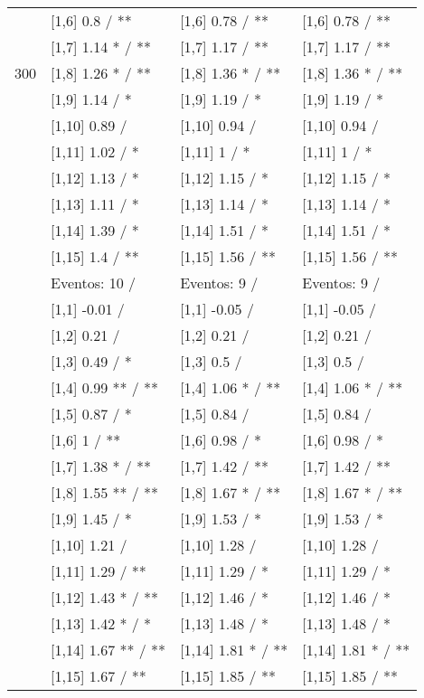 \begin{table}
\begin{tabular}[t]{llll}
 & {}[1,6] 0.8  / ** & {}[1,6] 0.78  / ** & {}[1,6] 0.78  / **\\
 & {}[1,7] 1.14 * / ** & {}[1,7] 1.17  / ** & {}[1,7] 1.17  / **\\
300 & {}[1,8] 1.26 * / ** & {}[1,8] 1.36 * / ** & {}[1,8] 1.36 * / **\\
\addlinespace
 & {}[1,9] 1.14  / * & {}[1,9] 1.19  / * & {}[1,9] 1.19  / *\\
 & {}[1,10] 0.89  / & {}[1,10] 0.94  / & {}[1,10] 0.94  /\\
 & {}[1,11] 1.02  / * & {}[1,11] 1  / * & {}[1,11] 1  / *\\
 & {}[1,12] 1.13  / * & {}[1,12] 1.15  / * & {}[1,12] 1.15  / *\\
 & {}[1,13] 1.11  / * & {}[1,13] 1.14  / * & {}[1,13] 1.14  / *\\
\addlinespace
 & {}[1,14] 1.39  / * & {}[1,14] 1.51  / * & {}[1,14] 1.51  / *\\
 & {}[1,15] 1.4  / ** & {}[1,15] 1.56  / ** & {}[1,15] 1.56  / **\\
 & Eventos:  10 / & Eventos:  9 / & Eventos:  9 /\\
 & {}[1,1] -0.01  / & {}[1,1] -0.05  / & {}[1,1] -0.05  /\\
 & {}[1,2] 0.21  / & {}[1,2] 0.21  / & {}[1,2] 0.21  /\\
\addlinespace
 & {}[1,3] 0.49  / * & {}[1,3] 0.5  / & {}[1,3] 0.5  /\\
 & {}[1,4] 0.99 ** / ** & {}[1,4] 1.06 * / ** & {}[1,4] 1.06 * / **\\
 & {}[1,5] 0.87  / * & {}[1,5] 0.84  / & {}[1,5] 0.84  /\\
 & {}[1,6] 1  / ** & {}[1,6] 0.98  / * & {}[1,6] 0.98  / *\\
 & {}[1,7] 1.38 * / ** & {}[1,7] 1.42  / ** & {}[1,7] 1.42  / **\\
\addlinespace
500 & {}[1,8] 1.55 ** / ** & {}[1,8] 1.67 * / ** & {}[1,8] 1.67 * / **\\
 & {}[1,9] 1.45  / * & {}[1,9] 1.53  / * & {}[1,9] 1.53  / *\\
 & {}[1,10] 1.21  / & {}[1,10] 1.28  / & {}[1,10] 1.28  /\\
 & {}[1,11] 1.29  / ** & {}[1,11] 1.29  / * & {}[1,11] 1.29  / *\\
 & {}[1,12] 1.43 * / ** & {}[1,12] 1.46  / * & {}[1,12] 1.46  / *\\
\addlinespace
 & {}[1,13] 1.42 * / * & {}[1,13] 1.48  / * & {}[1,13] 1.48  / *\\
 & {}[1,14] 1.67 ** / ** & {}[1,14] 1.81 * / ** & {}[1,14] 1.81 * / **\\
 & {}[1,15] 1.67  / ** & {}[1,15] 1.85  / ** & {}[1,15] 1.85  / **\\
\bottomrule
\end{tabular}
\end{table}
